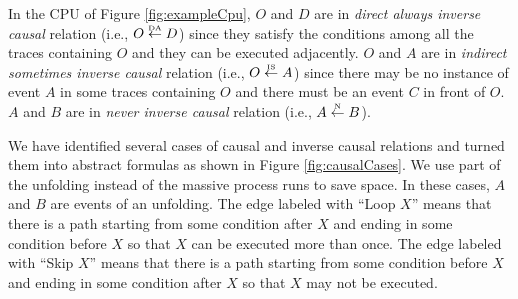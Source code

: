 \documentclass{llncs}
\begin{document}



\begin{example}
In the CPU of Figure \ref{fig:exampleCpu}, $O$ and $D$ are in \textit{direct always inverse causal} relation (i.e., $O\overset{\text{\tiny{DA}}}{\leftarrow}D$) since they satisfy the conditions among all the traces containing $O$ and they can be executed adjacently. $O$ and $A$ are in \textit{indirect sometimes inverse causal} relation (i.e., $O\overset{\text{\tiny{IS}}}{\leftarrow}A$) since there may be no instance of event $A$ in some traces containing $O$ and there must be an event $C$ in front of $O$. $A$ and $B$ are in \textit{never inverse causal} relation (i.e., $A\overset{\text{\tiny{N}}}{\leftarrow} B$).
\end{example}

We have identified several cases of causal and inverse causal relations and turned them into abstract formulas as shown in Figure \ref{fig:causalCases}. We use part of the unfolding instead of the massive process runs to save space. In these cases, $A$ and $B$ are events of an unfolding. The edge labeled with ``Loop $X$'' means that there is a path starting from some condition after $X$ and ending in some condition before $X$ so that $X$ can be executed more than once. The edge labeled with ``Skip $X$'' means that there is a path starting from some condition before $X$ and ending in some condition after $X$ so that $X$ may not be executed. %
\end{document}
